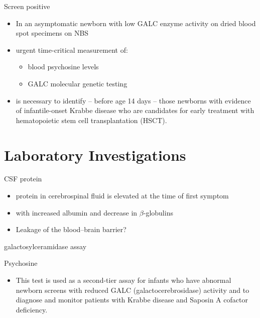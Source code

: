 \documentclass[presentation, smaller]{beamer}
\begin{document}
\begin{frame}[label={sec:org3296d54}]{Screen positive}
\begin{itemize}
\item In an asymptomatic newborn with low GALC enzyme activity
on dried blood spot specimens on NBS
\item urgent time-critical measurement of:
\begin{itemize}
\item blood psychosine levels
\item GALC molecular genetic testing
\end{itemize}
\item is necessary to identify – before age 14 days – those
newborns with evidence of infantile-onset Krabbe disease who are
candidates for early treatment with hematopoietic stem cell
transplantation (HSCT).
\end{itemize}
\end{frame}


\section{Laboratory Investigations}
\label{sec:orgce8aa8f}

\begin{frame}[label={sec:org393f6b1}]{CSF protein}
\begin{itemize}
\item protein in cerebrospinal fluid is elevated at the time of first symptom
\item with increased albumin and decrease in \(\beta\)-globulins
\item Leakage of the blood–brain barrier?
\end{itemize}
\end{frame}

\begin{frame}[label={sec:org99497fb}]{galactosylceramidase assay}
\end{frame}

\begin{frame}[label={sec:orgfbfd3d3}]{Psychosine}
\begin{itemize}
\item This test is used as a second-tier assay for infants who have abnormal newborn screens with reduced GALC (galactocerebrosidase) activity and to diagnose and monitor patients with Krabbe disease and Saposin A cofactor deficiency.
\end{itemize}
\end{frame}
\end{document}
